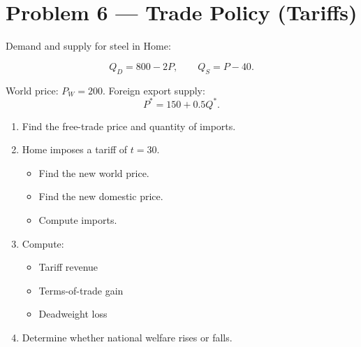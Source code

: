 \documentclass[12pt]{article}
\begin{document}

\section*{Problem 6 — Trade Policy (Tariffs)}

Demand and supply for steel in Home:

\[
Q_D = 800 - 2P, \qquad Q_S = P - 40.
\]

World price: $P_W = 200$.  
Foreign export supply:
\[
P^* = 150 + 0.5Q^*.
\]

\begin{enumerate}[label=(\arabic*)]
\item Find the free-trade price and quantity of imports.
\item Home imposes a tariff of $t = 30$.
    \begin{itemize}
        \item Find the new world price.
        \item Find the new domestic price.
        \item Compute imports.
    \end{itemize}
\item Compute:
    \begin{itemize}
        \item Tariff revenue
        \item Terms-of-trade gain
        \item Deadweight loss
    \end{itemize}
\item Determine whether national welfare rises or falls.
\end{enumerate}
\end{document}
